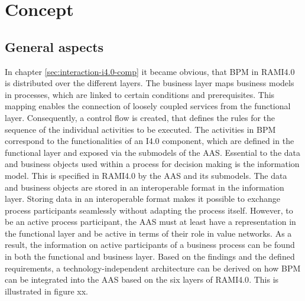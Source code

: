 \chapter{Concept} \label{chap:concept}

\section{General aspects} \label{sec:general-aspects}
In chapter \ref{sec:interaction-i4.0-comp} it became obvious, that \ac{BPM} in \ac{RAMI4.0} is distributed over the different layers. The business layer maps business models in processes, which are linked to certain conditions and prerequisites. This mapping enables the connection of loosely coupled services from the functional layer. Consequently, a control flow is created, that defines the rules for the sequence of the individual activities to be executed. The activities in \ac{BPM} correspond to the functionalities of an \ac{I4.0} component, which are defined in the functional layer and exposed via the submodels of the \ac{AAS}. Essential to the data and business objects used within a process for decision making is the information model. This is specified in \ac{RAMI4.0} by the \ac{AAS} and its submodels. The data and business objects are stored in an interoperable format in the information layer. Storing data in an interoperable format makes it possible to exchange process participants seamlessly without adapting the process itself. However, to be an active process participant, the \ac{AAS} must at least have a representation in the functional layer and be active in terms of their role in value networks. As a result, the information on active participants of a business process can be found in both the functional and business layer. Based on the findings and the defined requirements, a technology-independent architecture can be derived on how \ac{BPM} can be integrated into the \ac{AAS} based on the six layers of \ac{RAMI4.0}. This is illustrated in figure xx. 

